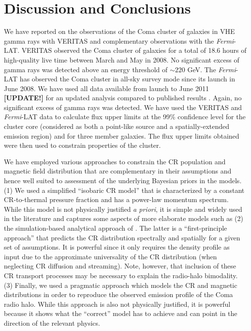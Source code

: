 \documentclass[12pt,manuscript]{aastex}
\begin{document}
\section{Discussion and Conclusions}
We have reported on the observations of the Coma cluster of galaxies in VHE gamma rays with VERITAS
and complementary observations with the \emph{Fermi}-LAT. VERITAS observed the Coma cluster of
galaxies for a total of 18.6 hours of high-quality live time between March and May in 2008. No
significant excess of gamma rays was detected above an energy threshold of $\sim 220$ GeV. The
\emph{Fermi}-LAT has observed the Coma cluster in all-sky survey mode since its launch in June
2008. We have used all data available from launch to June 2011 {\bf [UPDATE!]} for an updated analysis
compared to
published results \citep{article:Ackermann_etal:2010}. Again, no significant excess of gamma rays
was detected. We have used the VERITAS and \emph{Fermi}-LAT data to calculate flux upper limits at
the 99\% confidence level for the cluster core (considered as both a point-like source and a
spatially-extended emission region) and for three member galaxies. The flux upper limits obtained
were then used to constrain properties of the cluster.

We have employed various approaches to constrain the CR population and magnetic field distribution
that are complementary in their assumptions and hence well suited to assessment of the underlying
Bayesian priors in the models. (1) We used a simplified ``isobaric CR model'' that is characterized
by a constant CR-to-thermal pressure fraction and has a power-law momentum spectrum. While this
model is not physically justified {\em a priori}, it is simple and widely used in the literature and
captures some aspects of more elaborate models such as (2) the simulation-based analytical approach
of \citet{article:PinzkePfrommer:2010}. The latter is a ``first-principle approach'' that predicts
the CR distribution spectrally and spatially for a given set of assumptions.
It is powerful since it only requires the density profile as input due to the
approximate universality of the CR distribution (when neglecting CR diffusion and streaming). Note,
however, that inclusion of these CR transport processes may be necessary to explain the radio-halo
bimodality. (3) Finally, we used a pragmatic approach which models the CR and magnetic distributions
in order to reproduce the observed emission profile of the Coma radio halo. While this approach is
also not physically justified, it is powerful because it shows what the ``correct'' model has to
achieve and can point in the direction of the relevant physics.
\end{document}
